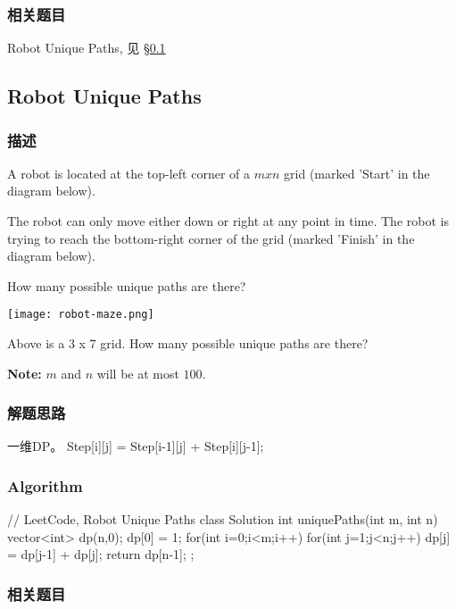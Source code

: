 \subsubsection{相关题目}

\begindot
\item Robot Unique Paths, 见 \S \ref{sec:robotuniquepaths}
\myenddot

\subsection{Robot Unique Paths}
\label{sec:robotuniquepaths}
\subsubsection{描述}
A robot is located at the top-left corner of a $m x n$ grid (marked 'Start' in the diagram below).

The robot can only move either down or right at any point in time. The robot is trying to reach the bottom-right corner of the grid (marked 'Finish' in the diagram below).

How many possible unique paths are there?

\begin{center}
	\texttt{[image: robot-maze.png]}\\
	\label{fig:robot-unique-paths}
\end{center}

Above is a 3 x 7 grid. How many possible unique paths are there?

{\bf Note:} $m$ and $n$ will be at most $100$.

\subsubsection{解题思路}
一维DP。 Step[i][j] = Step[i-1][j] + Step[i][j-1];

\subsubsection{Algorithm}
\begin{Code}
	// LeetCode, Robot Unique Paths
	class Solution {
		int uniquePaths(int m, int n) {
			vector<int> dp(n,0);
			dp[0] = 1;
			for(int i=0;i<m;i++){
				for(int j=1;j<n;j++)
					dp[j] = dp[j-1] + dp[j];
			}
			return dp[n-1];
		}
	};
\end{Code}


\subsubsection{相关题目}

